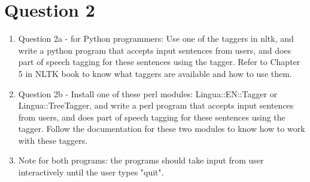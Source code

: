 \documentclass[11pt,a4paper]{article}
\begin{document}
\section*{Question 2}
\begin{enumerate}
\item Question 2a - for Python programmers: Use one of the taggers in nltk, and write a python program that accepts input sentences from users, and does part of speech tagging for these sentences using the tagger. Refer to Chapter 5 in NLTK book to know what taggers are available and how to use them. 
\item Question 2b - Install one of these perl modules: Lingua::EN::Tagger or Lingua::TreeTagger, and write a perl program that accepts input sentences from users, and does part of speech tagging for these sentences using the tagger. Follow the documentation for these two modules to know how to work with these taggers.
\item Note for both programs: the programs should take input from user interactively until the user types "quit".
\end{enumerate}
\end{document}
